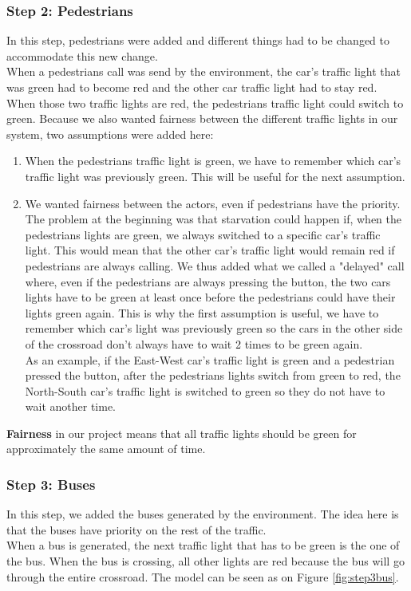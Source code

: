 \subsubsection{Step 2: Pedestrians}
In this step, pedestrians were added and different things had to be changed to accommodate this new change. \\ 

When a pedestrians call was send by the environment, the car's traffic light that was green had to become red and the other car traffic light had to stay red. When those two traffic lights are red, the pedestrians traffic light could switch to green. Because we also wanted fairness between the different traffic lights in our system, two assumptions were added here:
\begin{enumerate}
    \item When the pedestrians traffic light is green, we have to remember which car's traffic light was previously green. This will be useful for the next assumption.
    \item We wanted fairness between the actors, even if pedestrians have the priority. The problem at the beginning was that starvation could happen if, when the pedestrians lights are green, we always switched to a specific car's traffic light. This would mean that the other car's traffic light would remain red if pedestrians are always calling. We thus added what we called a "delayed" call where, even if the pedestrians are always pressing the button, the two cars lights have to be green at least once before the pedestrians could have their lights green again. This is why the first assumption is useful, we have to remember which car's light was previously green so the cars in the other side of the crossroad don't always have to wait 2 times to be green again. \\
    As an example, if the East-West car's traffic light is green and a pedestrian pressed the button, after the pedestrians lights switch from green to red, the North-South car's traffic light is switched to green so they do not have to wait another time.
\end{enumerate}
\textbf{Fairness} in our project means that all traffic lights should be green for approximately the same amount of time.

\subsubsection{Step 3: Buses}\label{sec:step3}
In this step, we added the buses generated by the environment. The idea here is that the buses have priority on the rest of the traffic. \\
When a bus is generated, the next traffic light that has to be green is the one of the bus. When the bus is crossing, all other lights are red because the bus will go through the entire crossroad. The model can be seen as on Figure \ref{fig:step3bus}. \\

